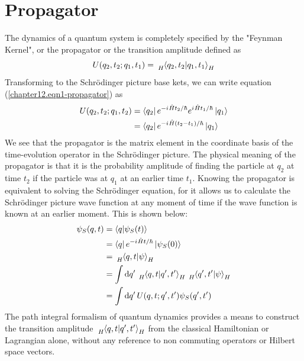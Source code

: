 	\section{Propagator}
	The dynamics of a quantum system is completely specified by the "Feynman Kernel", or the propagator or the transition amplitude defined as
	\begin{equation}
		U(q_2, t_2; q_1, t_1) =
		\tensor[_H]{\braket{q_2, t_2}{q_1, t_1}}{_H}
		\label{chapter12.eqn1-propagator}
	\end{equation}
	Transforming to the Schr\"{o}dinger picture base kets, we can write equation (\ref{chapter12.eqn1-propagator}) as
	\begin{align}
		U(q_2, t_2; q_1, t_2) 
		&= \bra{q_2}e^{-{i\mkern1mu} \hat{H}t_2/\hbar} e^{{i\mkern1mu} \hat{H}t_1/\hbar} \ket{q_1} \nonumber \\
		&= \bra{q_2}e^{-{i\mkern1mu} \hat{H}(t_2-t_1)/\hbar} \ket{q_1} \label{chapter12.eqn2-propagator}
	\end{align}
	We see that the propagator is the matrix element in the coordinate basis of the time-evolution operator in the Schr\"{o}dinger picture. The physical meaning of the propagator is that it is the probability amplitude of finding the particle at $q_2$ at time $t_2$ if the particle was at $q_1$ at an earlier time $t_1$. Knowing the propagator is equivalent to solving the Schr\"{o}dinger equation, for it allows us to calculate the Schr\"{o}dinger picture wave function at any moment of time if the wave function is known at an earlier moment. This is shown below:
	\begin{align}
		\psi_S(q,t )
		&= \braket{q}{\psi_S(t)} \\
		&= \bra{q}e^{-\iu \hat{H}t/\hbar} \ket{\psi_S(0)} \\
		&= \tensor[_H]{\braket{q,t}{\psi}}{_H} \\
		&= \int \dd{q^\prime} \tensor[_H]{\braket{q,t}{q^\prime, t^\prime}}{_H} \tensor[_H]{\braket{q^\prime, t^\prime}{\psi}}{_H} \\
		&= \int \dd{q^\prime} U(q,t;q^\prime, t^\prime) \psi_S(q^\prime,t^\prime)
	\end{align}
	The path integral formalism of quantum dynamics provides a means to construct the transition amplitude $\tensor[_H]{\braket{q,t}{q^\prime, t^\prime}}{_H}$ from the classical Hamiltonian or Lagrangian alone, without any reference to non commuting operators or Hilbert space vectors.

